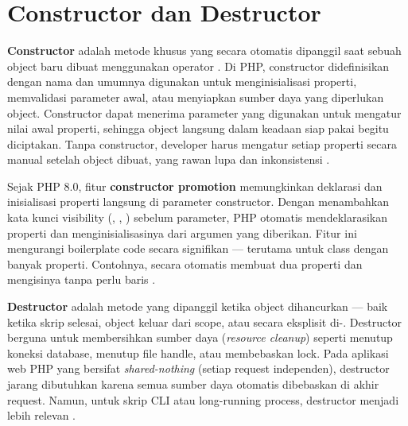 \section{Constructor dan Destructor}

\textbf{Constructor} adalah metode khusus yang secara otomatis dipanggil saat sebuah object baru dibuat menggunakan operator . Di PHP, constructor didefinisikan dengan nama  dan umumnya digunakan untuk menginisialisasi properti, memvalidasi parameter awal, atau menyiapkan sumber daya yang diperlukan object. Constructor dapat menerima parameter yang digunakan untuk mengatur nilai awal properti, sehingga object langsung dalam keadaan siap pakai begitu diciptakan. Tanpa constructor, developer harus mengatur setiap properti secara manual setelah object dibuat, yang rawan lupa dan inkonsistensi \cite{phpManual}.

Sejak PHP 8.0, fitur \textbf{constructor promotion} memungkinkan deklarasi dan inisialisasi properti langsung di parameter constructor. Dengan menambahkan kata kunci visibility (, , ) sebelum parameter, PHP otomatis mendeklarasikan properti dan menginisialisasinya dari argumen yang diberikan. Fitur ini mengurangi boilerplate code secara signifikan --- terutama untuk class dengan banyak properti. Contohnya,  secara otomatis membuat dua properti dan mengisinya tanpa perlu baris  \cite{phpRightWay}.

\textbf{Destructor} adalah metode  yang dipanggil ketika object dihancurkan --- baik ketika skrip selesai, object keluar dari scope, atau secara eksplisit di-. Destructor berguna untuk membersihkan sumber daya (\textit{resource cleanup}) seperti menutup koneksi database, menutup file handle, atau membebaskan lock. Pada aplikasi web PHP yang bersifat \textit{shared-nothing} (setiap request independen), destructor jarang dibutuhkan karena semua sumber daya otomatis dibebaskan di akhir request. Namun, untuk skrip CLI atau long-running process, destructor menjadi lebih relevan \cite{phpManual}.

